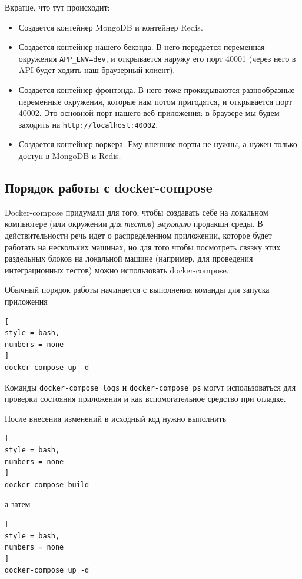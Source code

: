 \documentclass[%
	11pt,
	a4paper,
	utf8,
		]{article}
\begin{document}
Вкратце, что тут происходит:
\begin{itemize}
	\item Создается контейнер MongoDB и контейнер Redis.
	
	\item Создается контейнер нашего бекэнда. В него передается переменная окружения \verb*|APP_ENV=dev|, и открывается наружу его порт 40001 (через него в API будет ходить наш браузерный клиент).
	
	\item Создается контейнер фронтэнда. В него тоже прокидываются разнообразные переменные окружения, которые нам потом пригодятся, и открывается порт 40002. Это основной порт нашего веб-приложения: в браузере мы будем заходить на \verb*|http://localhost:40002|.
	
	\item Создается контейнер воркера. Ему внешние порты не нужны, а нужен только доступ в MongoDB и Redis.
\end{itemize}


\subsection{Порядок работы с docker-compose}

Docker-compose придумали для того, чтобы создавать себе на локальном компьютере (или окружении для \emph{тестов}) \emph{эмуляцию} продакшн среды. В действительности речь идет о распределенном приложении, которое будет работать на нескольких машинах, но для того чтобы посмотреть связку этих раздельных блоков на локальной машине (например, для проведения интеграционных тестов) можно использовать docker-compose.

Обычный порядок работы начинается с выполнения команды для запуска приложения
\begin{lstlisting}[
style = bash,
numbers = none
]
docker-compose up -d
\end{lstlisting}

Команды \texttt{docker-compose logs} и \texttt{docker-compose ps} могут использоваться для проверки состояния приложения и как вспомогательное средство при отладке.

После внесения изменений в исходный код нужно выполнить
\begin{lstlisting}[
style = bash,
numbers = none
]
docker-compose build
\end{lstlisting}
а затем 
\begin{lstlisting}[
style = bash,
numbers = none
]
docker-compose up -d
\end{lstlisting}
\end{document}
